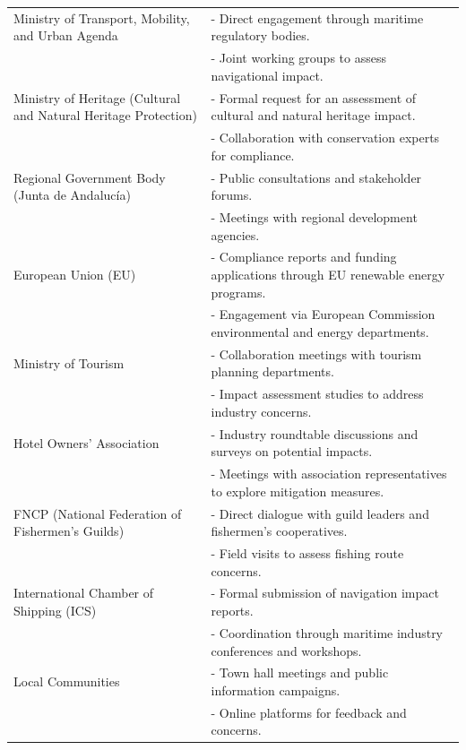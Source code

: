 \documentclass{article}
\begin{document}
\begin{longtable}{p{4cm} p{10cm}}
    Ministry of Transport, Mobility, and Urban Agenda &
    - Direct engagement through maritime regulatory bodies. \\
    & - Joint working groups to assess navigational impact. \\

    Ministry of Heritage (Cultural and Natural Heritage Protection) &
    - Formal request for an assessment of cultural and natural heritage impact. \\
    & - Collaboration with conservation experts for compliance. \\

    Regional Government Body (Junta de Andalucía) &
    - Public consultations and stakeholder forums. \\
    & - Meetings with regional development agencies. \\

    European Union (EU) &
    - Compliance reports and funding applications through EU renewable energy programs. \\
    & - Engagement via European Commission environmental and energy departments. \\

    Ministry of Tourism &
    - Collaboration meetings with tourism planning departments. \\
    & - Impact assessment studies to address industry concerns. \\

    Hotel Owners’ Association &
    - Industry roundtable discussions and surveys on potential impacts. \\
    & - Meetings with association representatives to explore mitigation measures. \\

    FNCP (National Federation of Fishermen’s Guilds) &
    - Direct dialogue with guild leaders and fishermen’s cooperatives. \\
    & - Field visits to assess fishing route concerns. \\

    International Chamber of Shipping (ICS) &
    - Formal submission of navigation impact reports. \\
    & - Coordination through maritime industry conferences and workshops. \\

    Local Communities &
    - Town hall meetings and public information campaigns. \\
    & - Online platforms for feedback and concerns. \\


\end{longtable}
\end{document}
